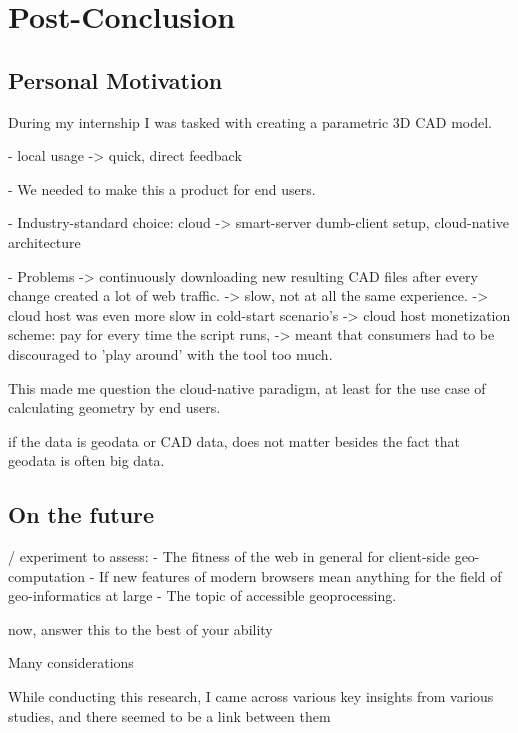 \chapter{Post-Conclusion}%

\section{Personal Motivation}
During my internship I was tasked with creating a parametric 3D CAD model. 

- local usage 
  -> quick, direct feedback

- We needed to make this a product for end users. 

- Industry-standard choice: cloud 
  -> smart-server dumb-client setup, cloud-native architecture 

- Problems
  -> continuously downloading new resulting CAD files after every change created a lot of web traffic. 
  -> slow, not at all the same experience.
  -> cloud host was even more slow in cold-start scenario's   
  -> cloud host monetization scheme: pay for every time the script runs, 
     -> meant that consumers had to be discouraged to 'play around' with the tool too much. 
  
This made me question the cloud-native paradigm, at least for the use case of calculating geometry by end users. 


if the data is geodata or CAD data, does not matter besides the fact that geodata is often big data.


\section{On the future}

/ experiment to assess: 
- The fitness of the web in general for client-side geo-computation
- If new features of modern browsers mean anything for the field of geo-informatics at large 
- The topic of accessible geoprocessing.

now, answer this to the best of your ability

Many considerations


While conducting this research, I came across various key insights from various studies, and there seemed to be a link between them 

